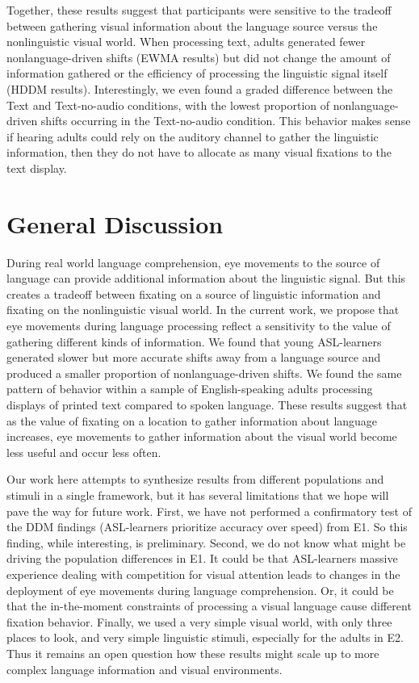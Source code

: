 \documentclass[10pt, letterpaper]{article}
\begin{document}
Together, these results suggest that participants were sensitive to the
tradeoff between gathering visual information about the language source
versus the nonlinguistic visual world. When processing text, adults
generated fewer nonlanguage-driven shifts (EWMA results) but did not
change the amount of information gathered or the efficiency of
processing the linguistic signal itself (HDDM results). Interestingly,
we even found a graded difference between the Text and Text-no-audio
conditions, with the lowest proportion of nonlanguage-driven shifts
occurring in the Text-no-audio condition. This behavior makes sense if
hearing adults could rely on the auditory channel to gather the
linguistic information, then they do not have to allocate as many visual
fixations to the text display.

\section{General Discussion}\label{general-discussion}

During real world language comprehension, eye movements to the source of
language can provide additional information about the linguistic signal.
But this creates a tradeoff between fixating on a source of linguistic
information and fixating on the nonlinguistic visual world. In the
current work, we propose that eye movements during language processing
reflect a sensitivity to the value of gathering different kinds of
information. We found that young ASL-learners generated slower but more
accurate shifts away from a language source and produced a smaller
proportion of nonlanguage-driven shifts. We found the same pattern of
behavior within a sample of English-speaking adults processing displays
of printed text compared to spoken language. These results suggest that
as the value of fixating on a location to gather information about
language increases, eye movements to gather information about the visual
world become less useful and occur less often.

Our work here attempts to synthesize results from different populations
and stimuli in a single framework, but it has several limitations that
we hope will pave the way for future work. First, we have not performed
a confirmatory test of the DDM findings (ASL-learners prioritize
accuracy over speed) from E1. So this finding, while interesting, is
preliminary. Second, we do not know what might be driving the population
differences in E1. It could be that ASL-learners massive experience
dealing with competition for visual attention leads to changes in the
deployment of eye movements during language comprehension. Or, it could
be that the in-the-moment constraints of processing a visual language
cause different fixation behavior. Finally, we used a very simple visual
world, with only three places to look, and very simple linguistic
stimuli, especially for the adults in E2. Thus it remains an open
question how these results might scale up to more complex language
information and visual environments.
\end{document}
